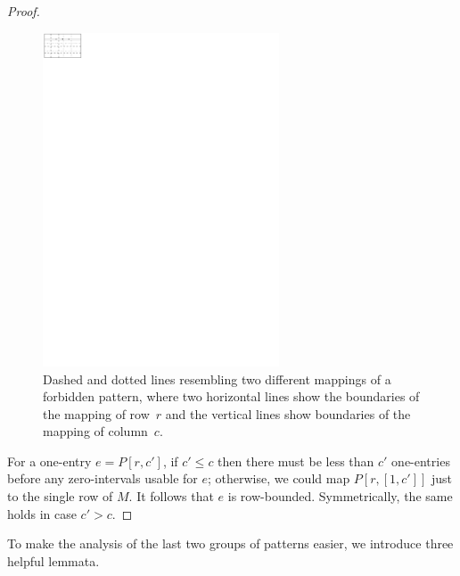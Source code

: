 \begin{proof}
\begin{figure}[!ht]
\centering
\includegraphics[width=70mm]{img/twolines.pdf}
\caption{Dashed and dotted lines resembling two different mappings of a forbidden pattern, where two horizontal lines show the boundaries of the mapping of row~$r$ and the vertical lines show boundaries of the mapping of column~$c$.}
\label{fig:twolines}
\end{figure}

For a one-entry $e=P[r,c']$, if $c'\leq c$ then there must be less than $c'$ one-entries before any zero-intervals usable for $e$; otherwise, we could map $P[r,[1,c']]$ just to the single row of $M$. It follows that $e$ is row-bounded. Symmetrically, the same holds in case $c'>c$. 
\end{proof}

To make the analysis of the last two groups of patterns easier, we introduce three helpful lemmata.

